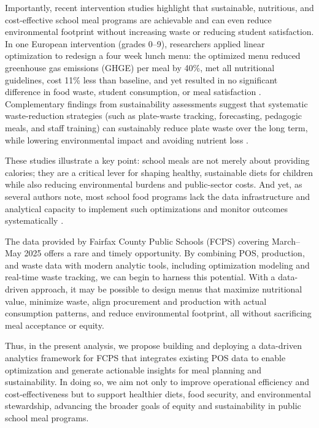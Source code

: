 \documentclass[journal]{IEEEtran}
\begin{document}
Importantly, recent intervention studies highlight that sustainable, nutritious, and cost-effective school meal programs are achievable and can even reduce environmental footprint without increasing waste or reducing student satisfaction. In one European intervention (grades 0–9), researchers applied linear optimization to redesign a four week lunch menu: the optimized menu reduced greenhouse gas emissions (GHGE) per meal by 40\%, met all nutritional guidelines, cost 11\% less than baseline, and yet resulted in no significant difference in food waste, student consumption, or meal satisfaction \cite{colombo}. Complementary findings from sustainability assessments suggest that systematic waste-reduction strategies (such as plate-waste tracking, forecasting, pedagogic meals, and staff training) can sustainably reduce plate waste over the long term, while lowering environmental impact and avoiding nutrient loss \cite{sundin}.

These studies illustrate a key point: school meals are not merely about providing calories; they are a critical lever for shaping healthy, sustainable diets for children while also reducing environmental burdens and public-sector costs. And yet, as several authors note, most school food programs lack the data infrastructure and analytical capacity to implement such optimizations and monitor outcomes systematically \cite{byker}.

The data provided by Fairfax County Public Schools (FCPS) covering March–May 2025 offers a rare and timely opportunity. By combining POS, production, and waste data with modern analytic tools, including optimization modeling and real-time waste tracking, we can begin to harness this potential. With a data-driven approach, it may be possible to design menus that maximize nutritional value, minimize waste, align procurement and production with actual consumption patterns, and reduce environmental footprint, all without sacrificing meal acceptance or equity.

Thus, in the present analysis, we propose building and deploying a data-driven analytics framework for FCPS that integrates existing POS data to enable optimization and generate actionable insights for meal planning and sustainability. In doing so, we aim not only to improve operational efficiency and cost-effectiveness but to support healthier diets, food security, and environmental stewardship, advancing the broader goals of equity and sustainability in public school meal programs.

\end{document}
